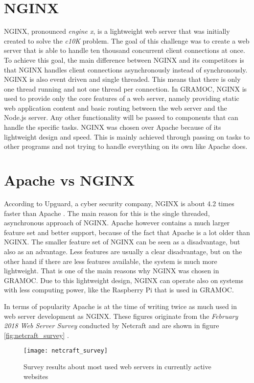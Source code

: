 \section{NGINX}
NGINX, pronounced \textit{engine x}, is a lightweight web server that was initially created to solve the \textit{c10K} problem. The goal of this challenge was to create a web server that is able to handle ten thousand concurrent client connections at once. To achieve this goal, the main difference between NGINX and its competitors is that NGINX handles client connections asynchronously instead of synchronously. NGINX is also event driven and single threaded. This means that there is only one thread running and not one thread per connection. In GRAMOC, NGINX is used to provide only the core features of a web server, namely providing static web application content and basic routing between the web server and the Node.js server. Any other functionality will be passed to components that can handle the specific tasks. NGINX was chosen over Apache because of its lightweight design and speed. This is mainly achieved through passing on tasks to other programs and not trying to handle everything on its own like Apache does.

\section{Apache vs NGINX}
According to Upguard, a cyber security company, NGINX is about 4.2 times faster than Apache \autocite{UpguardAvN}. The main reason for this is the single threaded, asynchronous approach of NGINX.
Apache however contains a much larger feature set and better support, because of the fact that Apache is a lot older than NGINX. The smaller feature set of NGINX can be seen as a disadvantage, but also as an advantage. Less features are usually a clear disadvantage, but on the other hand if there are less features available, the system is much more lightweight. That is one of the main reasons why NGINX was chosen in GRAMOC. Due to this lightweight design, NGINX can operate also on systems with less computing power, like the Raspberry Pi that is used in GRAMOC.

In terms of popularity Apache is at the time of writing twice as much used in web server development as NGINX. These figures originate from the \textit{February 2018 Web Server Survey} conducted by Netcraft and are shown in figure \vref{fig:netcraft_survey} \autocite{netcraft_survey}.

\begin{figure}[h]
    \centering
    \texttt{[image: netcraft\_survey]}
    \caption{Survey results about most used web servers in currently active websites}
    \label{fig:netcraft_survey}
\end{figure}

